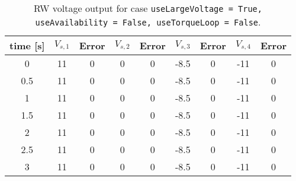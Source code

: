 \begin{table}[htbp]\caption{RW voltage output for case {\tt useLargeVoltage = True, useAvailability = False, useTorqueLoop = False}.}\label{tbl:testTrueFalseFalse}\centering\begin{tabular}{ccccccccc}
\hline
  time [s]  &  $V_{s,1}$  &  Error  &  $V_{s,2}$  &  Error  &  $V_{s,3}$  &  Error  &  $V_{s,4}$  &  Error  \\
\hline
     0      &     11      &    0    &      0      &    0    &    -8.5     &    0    &     -11     &    0    \\
    0.5     &     11      &    0    &      0      &    0    &    -8.5     &    0    &     -11     &    0    \\
     1      &     11      &    0    &      0      &    0    &    -8.5     &    0    &     -11     &    0    \\
    1.5     &     11      &    0    &      0      &    0    &    -8.5     &    0    &     -11     &    0    \\
     2      &     11      &    0    &      0      &    0    &    -8.5     &    0    &     -11     &    0    \\
    2.5     &     11      &    0    &      0      &    0    &    -8.5     &    0    &     -11     &    0    \\
     3      &     11      &    0    &      0      &    0    &    -8.5     &    0    &     -11     &    0    \\
\hline\end{tabular}\end{table}
